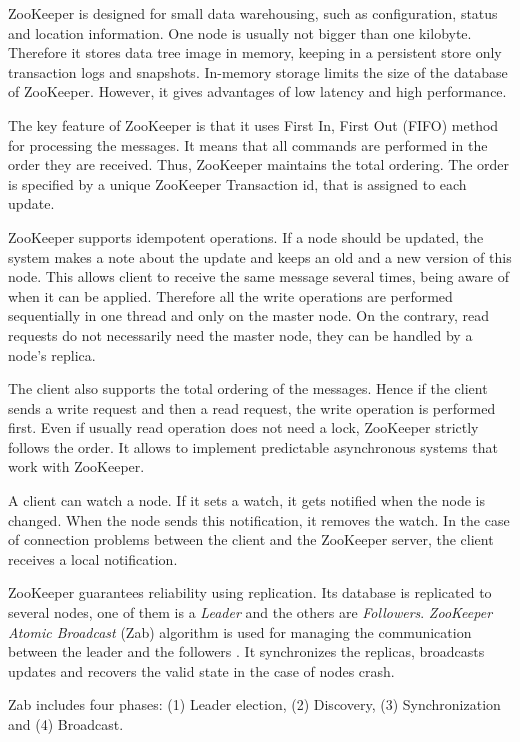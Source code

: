 ZooKeeper is designed for small data warehousing, such as configuration, status and location information.
One node is usually not bigger than one kilobyte.
Therefore it stores data tree image in memory, keeping in a persistent store only transaction logs and snapshots.
In-memory storage limits the size of the database of ZooKeeper.
However, it gives advantages of low latency and high performance. 

The key feature of ZooKeeper is that it uses First In, First Out (FIFO) method for processing the messages.
It means that all commands are performed in the order they are received.
Thus, ZooKeeper maintains the total ordering.
The order is specified by a unique ZooKeeper Transaction id, that is assigned to each update.
 
ZooKeeper supports idempotent operations.
If a node should be updated, the system makes a note about the update and keeps an old and a new version of this node.
This allows client to receive the same message several times, being aware of when it can be applied.
Therefore all the write operations are performed sequentially in one thread and only on the master node.
On the contrary, read requests do not necessarily need the master node, they can be handled by a node's replica.

The client also supports the total ordering of the messages.
Hence if the client sends a write request and then a read request, the write operation is performed first.
Even if usually read operation does not need a lock, ZooKeeper strictly follows the order.
It allows to implement predictable asynchronous systems that work with ZooKeeper.

A client can watch a node.
If it sets a watch, it gets notified when the node is changed.
When the node sends this notification, it removes the watch.
In the case of connection problems between the client and the ZooKeeper server, the client receives a local notification.

ZooKeeper guarantees reliability using replication.
Its database is replicated to several nodes, one of them is a \textit{Leader} and the others are \textit{Followers}.
\textit{ZooKeeper Atomic Broadcast} (Zab) algorithm is used for managing the communication between the leader and the followers \cite{Medeiros2012}.
It synchronizes the replicas, broadcasts updates and recovers the valid state in the case of nodes crash.

Zab includes four phases: (1) Leader election, (2) Discovery, (3) Synchronization and (4) Broadcast.

